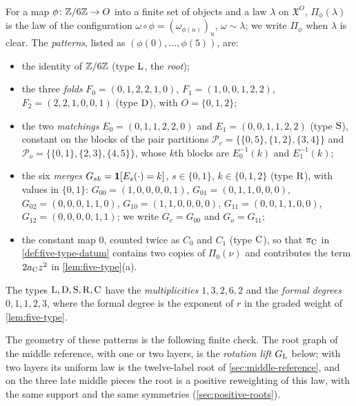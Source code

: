 \begin{definition}\label{def:patterns}
For a map $\phi\colon\mathbb Z/6\mathbb Z\to O$ into a finite set of objects and a law
$\lambda$ on $\mathfrak X^O$, $\Pi_\phi(\lambda)$ is the law of the configuration
$\omega\circ\phi=(\omega_{\phi(u)})_u$, $\omega\sim\lambda$; we write $\Pi_\phi$
when $\lambda$ is clear. The \emph{patterns}, listed as $(\phi(0),\dots,\phi(5))$,
are:
\begin{itemize}
\item the identity of $\mathbb Z/6\mathbb Z$ (type $\rm L$, the \emph{root});
\item the three \emph{folds} $F_0=(0,1,2,2,1,0)$, $F_1=(1,0,0,1,2,2)$,
 $F_2=(2,2,1,0,0,1)$ (type $\rm D$), with $O=\{0,1,2\}$;
\item the two \emph{matchings} $E_0=(0,1,1,2,2,0)$ and $E_1=(0,0,1,1,2,2)$
 (type $\rm S$), constant on the blocks of the pair partitions
 $\mathcal P_e=\{\{0,5\},\{1,2\},\{3,4\}\}$ and
 $\mathcal P_o=\{\{0,1\},\{2,3\},\{4,5\}\}$, whose $k$th blocks are
 $E_0^{-1}(k)$ and $E_1^{-1}(k)$;
\item the six \emph{merges} $G_{sk}=\mathbf 1[E_s(\cdot)=k]$, $s\in\{0,1\}$,
 $k\in\{0,1,2\}$ (type $\rm R$), with values in $\{0,1\}$:
 $G_{00}=(1,0,0,0,0,1)$, $G_{01}=(0,1,1,0,0,0)$, $G_{02}=(0,0,0,1,1,0)$,
 $G_{10}=(1,1,0,0,0,0)$, $G_{11}=(0,0,1,1,0,0)$, $G_{12}=(0,0,0,0,1,1)$; we
 write $G_e=G_{00}$ and $G_o=G_{11}$;
\item the constant map $0$, counted twice as $C_0$ and $C_1$ (type $\rm C$),
 so that $\pi_{\rm C}$ in \cref{def:five-type-datum} contains two copies of
 $\Pi_0(\nu)$ and contributes the term $2a_{\rm C}z^2$ in
 \cref{lem:five-type}(a).
\end{itemize}
The types $\rm L,D,S,R,C$ have the \emph{multiplicities}
$1,3,2,6,2$ and the \emph{formal degrees} $0,1,1,2,3$, where the
formal degree is the exponent of $r$ in the graded weight of
\cref{lem:five-type}.
\end{definition}

The geometry of these patterns is the following finite check. The root graph
of the middle reference, with one or two layers, is the \emph{rotation lift}
$G_{\rm L}$ below; with two layers its uniform law is the twelve-label root of
\cref{sec:middle-reference}, and on the three late middle pieces the root is a
positive reweighting of this law, with the same support and the same
symmetries (\cref{sec:positive-roots}).

